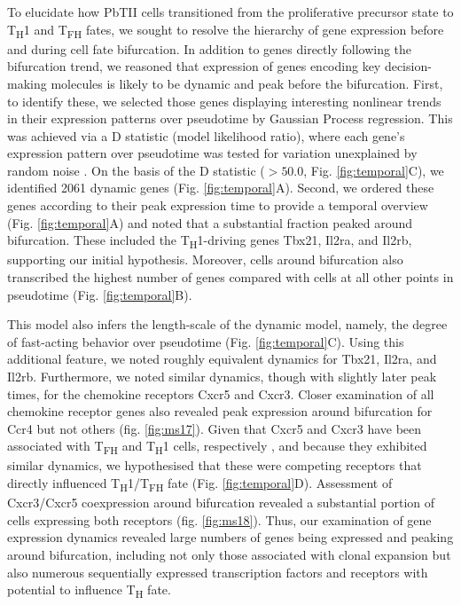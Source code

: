 To elucidate how PbTII cells transitioned from the proliferative precursor state to T\textsubscript{H}1 and T\textsubscript{FH} fates, we sought to resolve the hierarchy of gene expression before and during cell fate bifurcation. In addition to genes directly following the bifurcation trend, we reasoned that expression of genes encoding key decision-making molecules is likely to be dynamic and peak before the bifurcation. First, to identify these, we selected those genes displaying interesting nonlinear trends in their expression patterns over pseudotime by Gaussian Process regression. This was achieved via a D statistic (model likelihood ratio), where each gene’s expression pattern over pseudotime was tested for variation unexplained by random noise \cite{Macaulay2016-zd}. On the basis of the D statistic (\( > 50.0 \), Fig. \ref{fig:temporal}C), we identified 2061 dynamic genes (Fig. \ref{fig:temporal}A). Second, we ordered these genes according to their peak expression time to provide a temporal overview (Fig. \ref{fig:temporal}A) and noted that a substantial fraction peaked around bifurcation. These included the T\textsubscript{H}1-driving genes Tbx21, Il2ra, and Il2rb, supporting our initial hypothesis. Moreover, cells around bifurcation also transcribed the highest number of genes compared with cells at all other points in pseudotime (Fig. \ref{fig:temporal}B).

This model also infers the length-scale of the dynamic model, namely, the degree of fast-acting behavior over pseudotime (Fig. \ref{fig:temporal}C). Using this additional feature, we noted roughly equivalent dynamics for Tbx21, Il2ra, and Il2rb. Furthermore, we noted similar dynamics, though with slightly later peak times, for the chemokine receptors Cxcr5 and Cxcr3. Closer examination of all chemokine receptor genes also revealed peak expression around bifurcation for Ccr4 but not others (fig. \ref{fig:ms17}). Given that Cxcr5 and Cxcr3 have been associated with T\textsubscript{FH} and T\textsubscript{H}1 cells, respectively \cite{Groom2012-az, Breitfeld2000-yk, Schaerli2000-hl}, and because they exhibited similar dynamics, we hypothesised that these were competing receptors that directly influenced T\textsubscript{H}1/T\textsubscript{FH} fate (Fig. \ref{fig:temporal}D). Assessment of Cxcr3/Cxcr5 coexpression around bifurcation revealed a substantial portion of cells expressing both receptors (fig. \ref{fig:ms18}). Thus, our examination of gene expression dynamics revealed large numbers of genes being expressed and peaking around bifurcation, including not only those associated with clonal expansion but also numerous sequentially expressed transcription factors and receptors with potential to influence T\textsubscript{H} fate.

